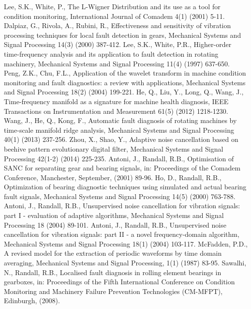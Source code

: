 \documentclass[3p,times]{elsarticle}
\begin{document}
\begin{thebibliography}{00}
	Lee, S.K., White, P., The L-Wigner Distribution and its use as a tool for condition monitoring, International Journal of Comadem 4(1) (2001) 5-11.
	Dalpiaz, G., Rivola, A., Rubini, R.,  Effectiveness and sensitivity of vibration processing techniques for local fault detection in gears,  Mechanical  Systems and Signal Processing 14(3) (2000) 387-412.
	Lee, S.K., White, P.R., Higher-order time-frequency analysis and its application to fault detection in rotating machinery,  Mechanical Systems and Signal Processing 11(4) (1997) 637-650.
	Peng, Z.K., Chu, F.L.,  Application of the wavelet transform in machine condition monitoring and fault diagnostics: a review with applications, Mechanical Systems and Signal Processing 18(2) (2004) 199-221.
	He, Q., Liu, Y., Long, Q., Wang, J., Time-frequency manifold as a signature for machine health diagnosis, IEEE Transactions on Instrumentation and Measurement 61(5) (2012) 1218-1230.
 Wang, J., He, Q., Kong, F., Automatic fault diagnosis of rotating machines by time-scale manifold ridge analysis, Mechanical Systems and Signal Processing 40(1) (2013) 237-256.
 Zhou, X., Shao, Y., Adaptive noise cancellation based on beehive pattern evolutionary digital filter, Mechanical Systems and Signal Processing 42(1-2) (2014) 225-235.
 Antoni, J., Randall, R.B., Optimisation of SANC for separating gear and bearing signals, in: Proceedings of the Comadem Conference, Manchester, September, (2001) 89-96.
 Ho, D., Randall, R.B., Optimization of bearing diagnostic techniques using simulated and actual bearing fault signals, Mechanical Systems and Signal Processing 14(5) (2000) 763-788.
 Antoni, J., Randall, R.B., Unsupervised noise cancellation for vibration signals: part I - evaluation of adaptive algorithms, Mechanical Systems and Signal Processing 18 (2004) 89-101.
 Antoni, J., Randall, R.B., Unsupervised noise cancellation for vibration signals: part II - a novel frequency-domain algorithm, Mechanical Systems and Signal Processing 18(1) (2004) 103-117.
 McFadden, P.D., A revised model for the extraction of periodic waveforms by time domain averaging, Mechanical Systems and Signal Processing, 1(1) (1987) 83-95.
 Sawalhi, N., Randall, R.B., Localised fault diagnosis in rolling element bearings in gearboxes, in: Proceedings of the Fifth International Conference on Condition Monitoring and Machinery Failure Prevention Technologies (CM-MFPT), Edinburgh, (2008).

\end{thebibliography}
\end{document}
